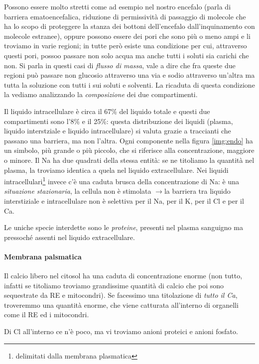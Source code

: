 \documentclass[a4paper,12pt]{article}
\newcommand{\lfreccia}{\ensuremath{\longrightarrow}}
\begin{document}
Possono essere molto stretti come ad esempio nel nostro encefalo (parla di barriera ematoencefalica, riduzione di permissività di passaggio di molecole che ha lo scopo di proteggere la stanza dei bottoni dell'encefalo dall'inquinamento con molecole estranee), oppure possono essere dei pori che sono più o meno ampi e li troviamo in varie regioni; in tutte però esiste una condizione per cui, attraverso questi pori, possoo passare non solo acqua ma anche tutti i soluti sia carichi che non.
Si parla in questi casi di \emph{flusso di massa}, vale a dire che fra queste due regioni può passare non glucosio attraverso una via e sodio attraverso un’altra ma tutta la soluzione con tutti i sui soluti e solventi. La ricaduta di questa condizione la vediamo analizzando la \emph{composizione} dei due compartimenti.

Il liquido intracellulare è circa il 67\% del liquido totale e questi due compartimenti sono l'8\% e il 25\%: questa distribuzione dei liquidi (plasma, liquido interstziale e liquido intracellulare) si valuta grazie a traccianti che passano una barriera, ma non l'altra. Ogni componente nella figura \ref{img:endo} ha un simbolo, più grande o più piccolo, che si riferisce alla concentrazione, maggiore o minore. Il Na ha due quadrati della stessa entità: se ne titoliamo la quantità nel plasma, la troviamo identica a quela nel liquido extracellulare. Nei liquidi intracellulari\footnote{delimitati dalla membrana plasmatica} invece c'è una caduta brusca della concentrazione di Na: è una \emph{situazione stazionaria}, la cellula non è stimolata \lfreccia la barriera tra liquido interstiziale e intracellulare non è selettiva per il Na, per il K, per il Cl e per il Ca. 

Le uniche specie interdette sono le \emph{proteine}, presenti nel plasma sanguigno ma pressoché assenti nel liquido extracellulare.

\paragraph{Membrana palsmatica}

Il calcio libero nel citosol ha una caduta di concentrazione enorme (non tutto, infatti se titoliamo troviamo grandissime quantità di calcio che poi sono sequestrate da RE e mitocondri). Se facessimo una titolazione di \emph{tutto il Ca}, troveremmo una quantità enorme, che viene catturata all'interno di organelli come il RE ed i mitocondri. 

Di Cl all'interno ce n'è poco, ma vi troviamo anioni proteici e anioni fosfato.
\end{document}
